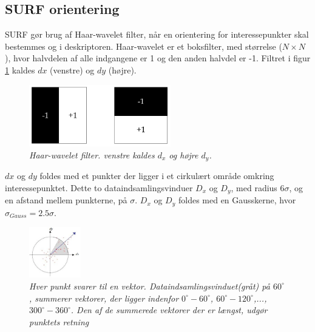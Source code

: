 \subsection{SURF orientering}
SURF gør brug af Haar-wavelet filter, når en orientering for interessepunkter skal bestemmes og i deskriptoren. Haar-wavelet er et boksfilter, med størrelse ($N\times N$), hvor halvdelen af alle indgangene er 1 og den anden halvdel er -1. Filtret i figur \ref{fig:haarwavelet} kaldes $dx$ (venstre) og $dy$ (højre).
\begin{figure}[H]
    \centering
    \includegraphics[width=0.55\textwidth]{fig/haarwavelet.png}
     \vspace{-1em}
    \begin{center}    
       \caption{\footnotesize \textit{{Haar-wavelet filter. venstre kaldes $d_x$ og højre $d_y$.}}}
    \label{fig:haarwavelet}
     \end{center}
     \vspace{-2.5em}
  \end{figure} \noindent
$dx$ og $dy$ foldes med et punkter der ligger i et cirkulært område omkring interessepunktet. Dette to dataindsamlingsvinduer $D_x$ og $D_y$, med radius $6\sigma$, og en afstand mellem punkterne, på $\sigma$. $D_x$ og $D_y$ foldes med en Gausskerne, hvor $\sigma_{Gauss} = 2.5\sigma$.
\begin{figure}[H]
    \centering
    \includegraphics[width=0.2\textwidth]{fig/surforientation.jpg}
     \vspace{-1em}
    \begin{center}    
       \caption{{\footnotesize \textit{Hver punkt svarer til en vektor. Dataindsamlingsvinduet(gråt) på $60^{\circ}$, summerer vektorer, der ligger indenfor $0^{\circ}-60^{\circ}$, $60^{\circ}-120^{\circ}$,..., $300^{\circ}-360^{\circ}$. Den af de summerede vektorer der er længst, udgør punktets retning}}}
    \label{fig:surforientation}
     \end{center}
     \vspace{-2.5em}
  \end{figure} \noindent
